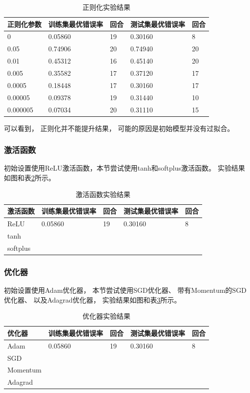 \documentclass{article}
\begin{document}
\begin{table}[h]
\centering
\begin{tabular}{|l|l|l|l|l|} 
\hline
正则化参数 & 训练集最优错误率 & 回合 & 测试集最优错误率 & 回合 \\
\hline
0 & 0.05860 & 19 & 0.30160 & 8 \\
0.05 & 0.74906 & 20 & 0.74940 & 20 \\
0.01 & 0.45312 & 16 & 0.45140 & 20 \\
0.005 & 0.35582 & 17 & 0.37120 & 17 \\
0.0005 & 0.18448 & 17 & 0.30160 & 17 \\
0.00005 & 0.09378 & 19 & 0.31440 & 10 \\
0.000005 & 0.07034 & 20 & 0.31110 & 15 \\
\hline
\end{tabular}
\caption{正则化实验结果}
\label{table:Regularize}
\end{table}

可以看到，
正则化并不能提升结果，
可能的原因是初始模型并没有过拟合。

\subsubsection{激活函数}

初始设置使用ReLU激活函数，本节尝试使用tanh和softplus激活函数。
实验结果如图和表\ref{table:Activation}所示。

\begin{table}[h]
\centering
\begin{tabular}{|l|l|l|l|l|} 
\hline
激活函数 & 训练集最优错误率 & 回合 & 测试集最优错误率 & 回合 \\
\hline
ReLU & 0.05860 & 19 & 0.30160 & 8 \\
tanh &  &  &  &  \\
softplus &  &  &  &  \\
\hline
\end{tabular}
\caption{激活函数实验结果}
\label{table:Activation}
\end{table}

\subsubsection{优化器}

初始设置使用Adam优化器，
本节尝试使用SGD优化器、
带有Momentum的SGD优化器、
以及Adagrad优化器，
实验结果如图和表\ref{table:Optimize}所示。

\begin{table}[h]
\centering
\begin{tabular}{|l|l|l|l|l|} 
\hline
优化器 & 训练集最优错误率 & 回合 & 测试集最优错误率 & 回合 \\
\hline
Adam & 0.05860 & 19 & 0.30160 & 8 \\
SGD &  &  &  &  \\
Momentum &  &  &  &  \\
Adagrad &  &  &  &  \\
\hline
\end{tabular}
\caption{优化器实验结果}
\label{table:Optimize}
\end{table}
\end{document}

